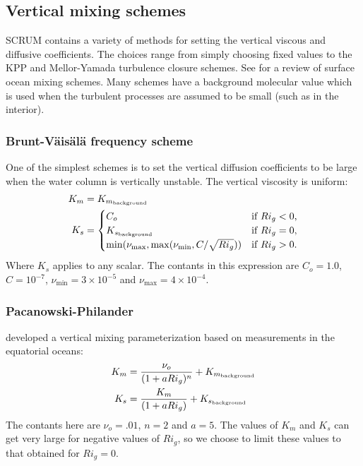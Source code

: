 \subsection{Vertical mixing schemes}
\label{Vmix}
SCRUM contains a variety of methods for setting the vertical viscous and
diffusive coefficients. The choices range from simply choosing fixed
values to the KPP and Mellor-Yamada turbulence closure schemes.
See \cite{Large98} for a review of surface ocean mixing schemes.
Many schemes have a background molecular value which is used when the
turbulent processes are assumed to be small (such as in the interior).

\subsubsection{Brunt-V\"ais\"al\"a frequency scheme}
One of the simplest schemes is to set the vertical diffusion
coefficients to be large when the water column is vertically unstable.
The vertical viscosity is uniform:
\begin{align}
   K_m &= K_{m_{\rm background}} \\
   K_s &=
   \begin{cases}
     C_o &                     \text{if $Ri_g < 0$,} \\
     K_{s_{\rm background}} & \text{if $Ri_g = 0$,} \\
     \min ( \nu_{\max}, \max ( \nu_{\min}, C / \sqrt{Ri_g} )) &
			       \text{if $Ri_g > 0$}.
   \end{cases}
\end{align}
Where $K_s$ applies to any scalar. The contants in this expression are
$C_o = 1.0$, $C = 10^{-7}$, $\nu_{\min} = 3 \times 10^{-5}$ and
$\nu_{\max} = 4 \times 10^{-4}$.

\subsubsection{Pacanowski-Philander}
\cite{Pacanowski81} developed a vertical
mixing parameterization based on measurements in the equatorial oceans:
\begin{align}
   K_m &= {\nu_o \over (1 + a Ri_g)^n} + K_{m_{\rm background}} \\
   K_s &= {K_m \over (1 + a Ri_g)} + K_{s_{\rm background}}
\end{align}
The contants here are $\nu_o = .01$, $n = 2$ and $a = 5$. The values of
$K_m$ and $K_s$ can get very large for negative values of $Ri_g$, so we
choose to limit these values to that obtained for $Ri_g = 0$.


